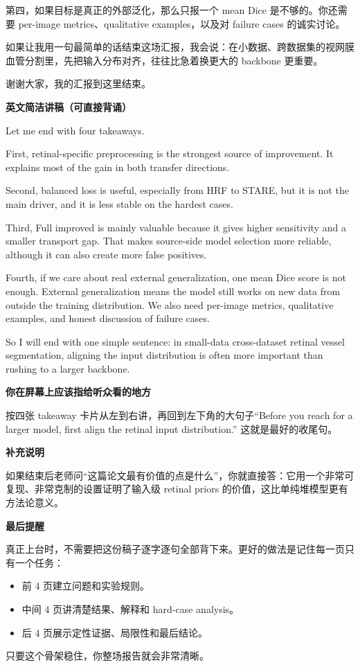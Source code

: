 \documentclass[12pt,a4paper]{ctexart}
\newcommand{\EnglishScriptHeading}{\textbf{\color{AccentGreen}英文简洁讲稿（可直接背诵）}}
\begin{document}
第四，如果目标是真正的外部泛化，那么只报一个 mean Dice 是不够的。你还需要 per-image metrics、qualitative examples，以及对 failure cases 的诚实讨论。

如果让我用一句最简单的话结束这场汇报，我会说：在小数据、跨数据集的视网膜血管分割里，先把输入分布对齐，往往比急着换更大的 backbone 更重要。

谢谢大家，我的汇报到这里结束。

\EnglishScriptHeading

Let me end with four takeaways.

First, retinal-specific preprocessing is the strongest source of improvement. It explains most of the gain in both transfer directions.

Second, balanced loss is useful, especially from HRF to STARE, but it is not the main driver, and it is less stable on the hardest cases.

Third, Full improved is mainly valuable because it gives higher sensitivity and a smaller transport gap. That makes source-side model selection more reliable, although it can also create more false positives.

Fourth, if we care about real external generalization, one mean Dice score is not enough. External generalization means the model still works on new data from outside the training distribution. We also need per-image metrics, qualitative examples, and honest discussion of failure cases.

So I will end with one simple sentence: in small-data cross-dataset retinal vessel segmentation, aligning the input distribution is often more important than rushing to a larger backbone.

\textbf{你在屏幕上应该指给听众看的地方}

按四张 takeaway 卡片从左到右讲，再回到左下角的大句子“Before you reach for a larger model, first align the retinal input distribution.” 这就是最好的收尾句。

\textbf{补充说明}

如果结束后老师问“这篇论文最有价值的点是什么”，你就直接答：它用一个非常可复现、非常克制的设置证明了输入级 retinal priors 的价值，这比单纯堆模型更有方法论意义。

\textbf{最后提醒}

真正上台时，不需要把这份稿子逐字逐句全部背下来。更好的做法是记住每一页只有一个任务：

\begin{itemize}[leftmargin=1.6em]
  \item 前 4 页建立问题和实验规则。
  \item 中间 4 页讲清楚结果、解释和 hard-case analysis。
  \item 后 4 页展示定性证据、局限性和最后结论。
\end{itemize}

只要这个骨架稳住，你整场报告就会非常清晰。
\end{document}
